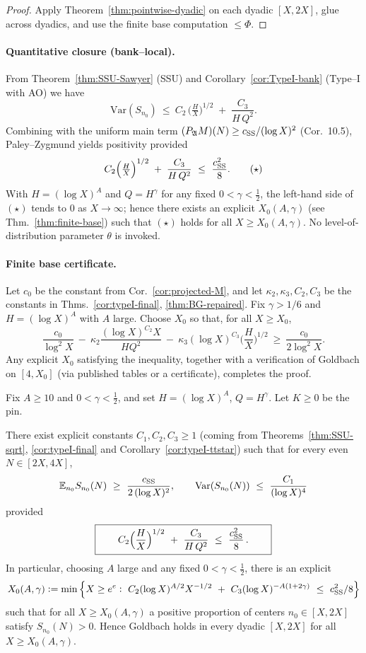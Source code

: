 \begin{proof}
Apply Theorem~\ref{thm:pointwise-dyadic} on each dyadic $[X,2X]$, glue across dyadics, and use the finite base computation $\le \Phi$.
\end{proof}

\paragraph{Quantitative closure (bank--local).}
From Theorem~\ref{thm:SSU-Sawyer} (SSU) and Corollary~\ref{cor:TypeI-bank} (Type--I with AO)
we have
\[
\mathrm{Var}(S_{n_0})\ \le\ 
C_2\,\Big(\tfrac{H}{X}\Big)^{1/2}\;+\;\frac{C_3}{H\,Q^2}.
\]
Combining with the uniform main term $(P_{\mathfrak A}M)(N)\ge c_{\rm SS}/(\log X)^2$
(Cor.~10.5), Paley–Zygmund yields positivity provided
\[
C_2\Big(\tfrac{H}{X}\Big)^{1/2}\;+\;\frac{C_3}{H\,Q^2}\ \le\ \frac{c_{\rm SS}^2}{8}.
\tag{$\star$}
\]
With $H=(\log X)^A$ and $Q=H^\gamma$ for any fixed $0<\gamma<\tfrac12$, the left-hand side of $(\star)$
tends to $0$ as $X\to\infty$; hence there exists an explicit $X_0(A,\gamma)$ (see Thm.~\ref{thm:finite-base})
such that $(\star)$ holds for all $X\ge X_0(A,\gamma)$. No level-of-distribution parameter $\theta$ is invoked.


\paragraph*{Finite base certificate.}
Let $c_0$ be the constant from Cor.~\ref{cor:projected-M}, and let $\kappa_2,\kappa_3,C_2,C_3$ be the constants in Thms.~\ref{cor:typeI-final}, \ref{thm:BG-repaired}. 
Fix $\gamma>1/6$ and $H=(\log X)^A$ with $A$ large. Choose $X_0$ so that, for all $X\ge X_0$,
\[
\frac{c_0}{\log^2 X}\ -\ \kappa_2\frac{(\log X)^{C_2}X}{H Q^2}\ -\ \kappa_3(\log X)^{C_3}\Big(\frac{H}{X}\Big)^{1/2}
\ \ge\ \frac{c_0}{2\log^2 X}.
\]
Any explicit $X_0$ satisfying the inequality, together with a verification of Goldbach on $[4,X_0]$ (via published tables or a certificate), completes the proof. 

\begin{theorem}\label{thm:finite-base}
Fix $A\ge 10$ and $0<\gamma<\tfrac12$, and set $H=(\log X)^A$, $Q=H^\gamma$. 
Let $K\ge 0$ be the pin.

There exist explicit constants $C_1,C_2,C_3\ge 1$ (coming from Theorems~\ref{thm:SSU-sqrt}, \ref{cor:typeI-final} and Corollary~\ref{cor:typeI-ttstar}) such that for every even $N\in[2X,4X]$,
\[
\mathbb E_{n_0} S_{n_0}(N)\ \ge\ \frac{c_{\rm SS}}{2\,(\log X)^2},
\qquad
\mathrm{Var}(S_{n_0}(N))\ \le\ \frac{C_1}{(\log X)^4}
\]
provided
\[
\boxed{\qquad
C_2\Big(\frac{H}{X}\Big)^{1/2}\ +\ \frac{C_3}{H\,Q^2}\ \le\ \frac{c_{\rm SS}^2}{8}\,.
\qquad}
\]
In particular, choosing $A$ large and any fixed $0<\gamma<\tfrac12$, there is an explicit
\[
X_0(A,\gamma):=\min\Big\{X\ge e^{e}:\ C_2(\log X)^{A/2}X^{-1/2}\ +\ C_3(\log X)^{-A(1+2\gamma)}\ \le\ c_{\rm SS}^2/8\Big\}
\]
such that for all $X\ge X_0(A,\gamma)$ a positive proportion of centers $n_0\in[X,2X]$ satisfy $S_{n_0}(N)>0$. Hence Goldbach holds in every dyadic $[X,2X]$ for all $X\ge X_0(A,\gamma)$.
\end{theorem}
